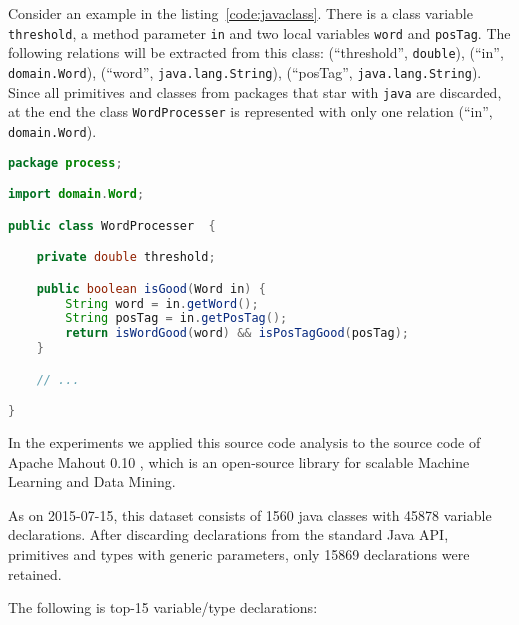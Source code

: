 Consider an example in the listing~\ref{code:javaclass}. There is a 
class variable \texttt{threshold}, a method parameter \texttt{in} and 
two local variables \texttt{word} and \texttt{posTag}. The following 
relations will be extracted from this class: (``threshold'', \verb|double|),
(``in'', \verb|domain.Word|), (``word'', \verb|java.lang.String|), 
(``posTag'', \verb|java.lang.String|).
Since all primitives and classes from packages that star with
\verb|java| are discarded, at the end the class \verb|WordProcesser| 
is represented with only one relation (``in'', \verb|domain.Word|).


\begin{lstlisting}[language=Java,caption={A java class},label={code:javaclass}]
package process;

import domain.Word;

public class WordProcesser  {

    private double threshold;

    public boolean isGood(Word in) {
        String word = in.getWord();
        String posTag = in.getPosTag();
        return isWordGood(word) && isPosTagGood(posTag);
    }

    // ...

}
\end{lstlisting}  


In the experiments we applied this source code analysis to 
the source code of Apache Mahout 0.10 \cite{mahout}, which is an open-source
library for scalable Machine Learning and Data Mining.

As on 2015-07-15, this dataset consists of 1560 java classes with 45878 
variable declarations. After discarding declarations from the standard Java API,
primitives and types with generic parameters, only 15869 declarations were 
retained. 

The following is top-15 variable/type declarations:

